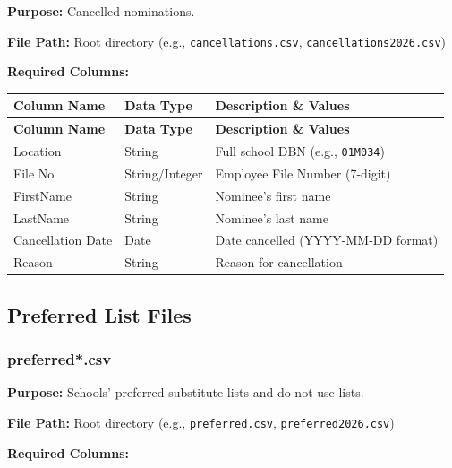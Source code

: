 \documentclass[12pt,letterpaper]{article}
\begin{document}
\textbf{Purpose:} Cancelled nominations.

\textbf{File Path:} Root directory (e.g., \texttt{cancellations.csv}, \texttt{cancellations2026.csv})

\textbf{Required Columns:}

\begin{longtable}{p{3.5cm}p{2.5cm}p{7cm}}
\toprule
\textbf{Column Name} & \textbf{Data Type} & \textbf{Description \& Values} \\
\midrule
\endfirsthead
\toprule
\textbf{Column Name} & \textbf{Data Type} & \textbf{Description \& Values} \\
\midrule
\endhead
Location & String & Full school DBN (e.g., \texttt{01M034}) \\
\midrule
File No & String/Integer & Employee File Number (7-digit) \\
\midrule
FirstName & String & Nominee's first name \\
\midrule
LastName & String & Nominee's last name \\
\midrule
Cancellation Date & Date & Date cancelled (YYYY-MM-DD format) \\
\midrule
Reason & String & Reason for cancellation \\
\bottomrule
\end{longtable}

\subsection{Preferred List Files}

\subsubsection{preferred*.csv}

\textbf{Purpose:} Schools' preferred substitute lists and do-not-use lists.

\textbf{File Path:} Root directory (e.g., \texttt{preferred.csv}, \texttt{preferred2026.csv})

\textbf{Required Columns:}
\end{document}
